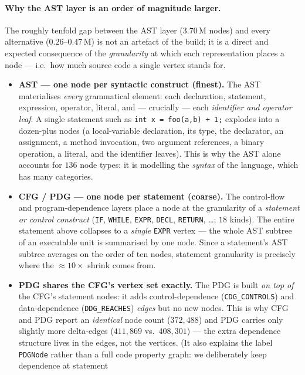 \documentclass[11pt,a4paper]{article}
\newcommand{\code}[1]{\texttt{#1}}
\begin{document}
	\paragraph{Why the AST layer is an order of magnitude larger.} The roughly
	tenfold gap between the AST layer ($3.70$\,M nodes) and every alternative
	($0.26$--$0.47$\,M) is not an artefact of the build; it is a direct and
	expected consequence of the \emph{granularity} at which each representation
	places a node --- i.e.\ how much source code a single vertex stands for.
	\begin{itemize}[nosep,leftmargin=1.4em]
		\item \textbf{AST --- one node per syntactic construct (finest).} The AST
		materialises \emph{every} grammatical element: each declaration, statement,
		expression, operator, literal, and --- crucially --- each \emph{identifier and
		operator leaf}. A single statement such as \code{int x = foo(a,b) + 1;}
		explodes into a dozen-plus nodes (a local-variable declaration, its type, the
		declarator, an assignment, a method invocation, two argument references, a
		binary operation, a literal, and the identifier leaves). This is why the AST
		alone accounts for $136$ node types: it is modelling the \emph{syntax} of the
		language, which has many categories.
		\item \textbf{CFG / PDG --- one node per statement (coarse).} The
		control-flow and program-dependence layers place a node at the granularity of
		a \emph{statement or control construct} (\code{IF}, \code{WHILE}, \code{EXPR},
		\code{DECL}, \code{RETURN}, \ldots; $18$ kinds). The entire statement above
		collapses to a \emph{single} \code{EXPR} vertex --- the whole AST subtree of an
		executable unit is summarised by one node. Since a statement's AST subtree
		averages on the order of ten nodes, statement granularity is precisely where
		the ${\approx}10\times$ shrink comes from.
		\item \textbf{PDG shares the CFG's vertex set exactly.} The PDG is built
		\emph{on top of} the CFG's statement nodes: it adds control-dependence
		(\code{CDG\_CONTROLS}) and data-dependence (\code{DDG\_REACHES}) \emph{edges}
		but no new nodes. This is why CFG and PDG report an \emph{identical} node
		count ($372{,}488$) and PDG carries only slightly more delta-edges
		($411{,}869$ vs.\ $408{,}301$) --- the extra dependence structure lives in the
		edges, not the vertices. (It also explains the label \code{PDGNode} rather
		than a full code property graph: we deliberately keep dependence at statement

\end{itemize}
\end{document}
